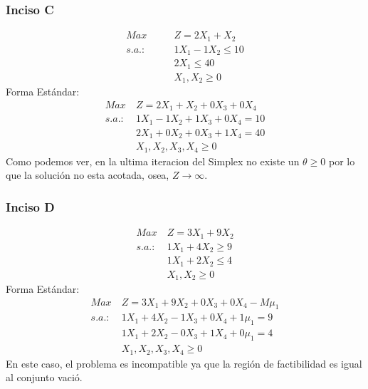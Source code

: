 \documentclass{tarea}
\begin{document}
\begin{homeworkProblem}
\subsubsection{Inciso C}
\begin{align*}
	Max\ &Z = 2X_1 + X_2 \\
	s.a.:\quad\quad &1X_1 - 1X_2 \le 10 \\
	&2X_1 \le 40 \\
	&X_1,X_2 \ge 0
\end{align*}
Forma Estándar:
\begin{align*}
	Max\ &Z = 2X_1 + X_2 + 0X_3 + 0X_4 \\
	s.a.: &1X_1 - 1X_2 + 1X_3 + 0X_4 = 10 \\
	&2X_1 + 0X_2 + 0X_3 + 1X_4 = 40 \\
	&X_1,X_2,X_3,X_4 \ge 0
\end{align*}
Como podemos ver, en la ultima iteracion del Simplex no existe un $\theta \ge 0$ por lo que la solución no esta acotada, osea, $Z\rightarrow  \infty$.

\subsubsection{Inciso D}
\begin{align*}
	Max\ &Z = 3X_1 + 9X_2 \\
	s.a.: &1X_1 + 4X_2 \ge 9 \\
	&1X_1 + 2X_2 \le 4 \\
	&X_1,X_2 \ge 0 
\end{align*}
Forma Estándar:
\begin{align*}
	Max\ &Z = 3X_1 + 9X_2 + 0X_3 + 0X_4 - M\mu_1 \\
	s.a.: &1X_1 + 4X_2 - 1X_3 + 0X_4 + 1\mu_1 = 9 \\
	&1X_1 + 2X_2 - 0X_3 + 1X_4 + 0\mu_1 = 4 \\
	&X_1,X_2,X_3,X_4 \ge 0
\end{align*}
En este caso, el problema es incompatible ya que la región de factibilidad es igual al conjunto vació.
\end{homeworkProblem}
\end{document}
